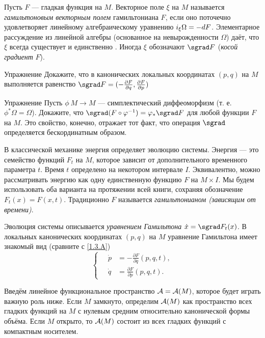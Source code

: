 Пусть $F$ — гладкая функция на $M$.
Векторное поле $\xi$ на $M$ называется \emph{гамильтоновым векторным полем} гамильтониана $F$, если оно поточечно удовлетворяет линейному алгебраическому уравнению $i_\xi \Omega \z= -dF$.
Элементарное рассуждение из линейной алгебры (основанное на невырожденности $\Omega$) даёт, что $\xi$ всегда существует и единственно \cite{MS}.
Иногда $\xi$ обозначают $\sgrad F$ (\emph{косой градиент} $F$).

\begin{ex}{Упражнение}\label{1.3.A}
Докажите, что в канонических локальных координатах $(p, q)$ на
$M$ выполняется равенство \index[symb]{$\sgrad$} $\sgrad F = (-\tfrac{\partial F}{\partial q},\tfrac{\partial F}{\partial p})$
\end{ex}

\begin{ex}{Упражнение}\label{1.3.B}
Пусть  $\phi\: M \to M$ — симплектический диффеоморфизм
(т. е. $\phi^\ast \Omega = \Omega$).
Докажите, что $\sgrad (F \circ \phi^{-1}) \z= \phi_\ast \sgrad F$ для любой функции $F$ на $M$.
Это свойство, конечно, отражает тот факт, что операция $\sgrad$ определяется бескординатным образом.
\end{ex}


В классической механике энергия определяет эволюцию системы.
Энергия — это семейство функций $F_t$ на $M$, которое зависит от
дополнительного временного параметра $t$.
Время $t$ определено на некотором интервале $I$.
Эквивалентно, можно рассматривать энергию как одну единственную функцию $F$ на $M \times I$.
Мы будем использовать оба варианта на протяжении всей книги, сохраняя обозначение $F_t (x) = F (x, t)$.
Традиционно $F$ называется \emph{гамильтонианом (зависящим от времени)}.

{\sloppy

Эволюция системы описывается \emph{уравнением Гамильтона} $\dot x \z= \sgrad F_t (x)$.
В локальных канонических координатах $(p, q)$ на $M$ уравнение
Гамильтона имеет знакомый вид (сравните с \ref{1.3.A})
\[
\begin{cases}
\quad\dot p &= - \tfrac{\partial F}{\partial q} (p, q, t),\\
\quad\dot q &= \tfrac{\partial F}{\partial p} (p, q, t).
\end{cases}
\]

}

Введём линейное функциональное пространство \index[symb]{$\A$}$\mathcal{A}=\mathcal{A}(M)$, которое будет играть важную роль ниже.
Если $M$ замкнуто, определим $\mathcal{A}(M)$ как пространство всех гладких функций на $M$ с нулевым средним относительно канонической формы объёма.
Если $M$ открыто, то $\mathcal{A}(M)$ состоит из всех гладких функций с компактным носителем.

